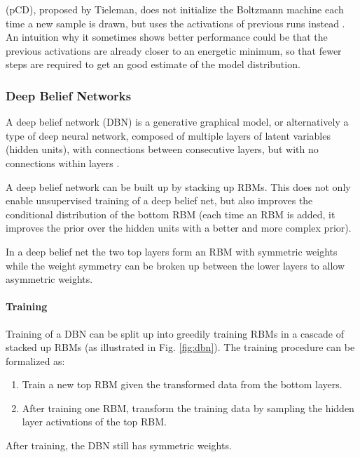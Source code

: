 (pCD), proposed by Tieleman, does not initialize the Boltzmann machine each time a new sample is drawn, but uses the activations of previous runs instead \cite{tieleman2008training}. An intuition why it sometimes shows better performance could be that the previous activations are already closer to an energetic minimum, so that fewer steps are required to get an good estimate of the model distribution. 


\subsubsection{Deep Belief Networks} \label{c:dbns}

A deep belief network (DBN) is a generative graphical model, or alternatively a type of deep neural network, composed of multiple layers of latent variables (hidden units), with connections between consecutive layers, but with no connections within layers \cite{hinton2006fast} \cite{hinton2009deep} \cite{Goodfellow-et-al-2016-Book}.

A deep belief network can be built up by stacking up RBMs.
This does not only enable unsupervised training of a deep belief net, but also improves the conditional distribution of the bottom RBM (each time an RBM is added, it improves the prior over the hidden units with a better and more complex prior).

In a deep belief net the two top layers form an RBM with symmetric weights while the weight symmetry can be broken up between the lower layers to allow asymmetric weights.   

\paragraph{Training} \label{c:dbntraining}

Training of a DBN can be split up into greedily training RBMs in a cascade of stacked up RBMs (as illustrated in Fig. \ref{fig:dbn}).
The training procedure can be formalized as:  
\begin{enumerate}
\item Train a new top RBM given the transformed data from the bottom layers.
\item After training one RBM, transform the training data by sampling the hidden layer activations of the top RBM.
\end{enumerate}

After training, the DBN still has symmetric weights. 

